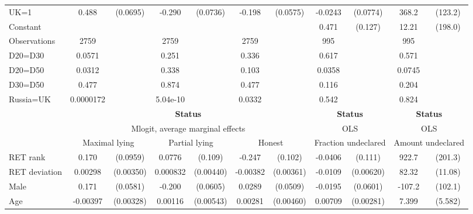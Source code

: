 \begin{tabular}{l|cccccc|cc|cc}
UK=1            &    0.488\sym{***}& (0.0695)&   -0.290\sym{***}& (0.0736)&   -0.198\sym{***}& (0.0575)&  -0.0243         & (0.0774)&    368.2\sym{***}&  (123.2)\\
Constant        &                  &         &                  &         &                  &         &    0.471\sym{***}&  (0.127)&    12.21         &  (198.0)\\
\hline
Observations    &     2759         &         &     2759         &         &     2759         &         &      995         &         &      995         &         \\
D20=D30         &   0.0571         &         &    0.251         &         &    0.336         &         &    0.617         &         &    0.571         &         \\
D20=D50         &   0.0312         &         &    0.338         &         &    0.103         &         &   0.0358         &         &   0.0745         &         \\
D30=D50         &    0.477         &         &    0.874         &         &    0.477         &         &    0.116         &         &    0.204         &         \\
Russia=UK       &0.0000172         &         & 5.04e-10         &         &   0.0332         &         &    0.542         &         &    0.824         &         \\
\hline\hline
&\multicolumn{6}{c|}{\bf Status}&\multicolumn{2}{c|}{\bf Status}&\multicolumn{2}{c}{\bf Status}\\ &\multicolumn{6}{c|}{Mlogit, average marginal effects }&\multicolumn{2}{c|}{OLS}&\multicolumn{2}{c}{OLS}\\
                &\multicolumn{2}{c}{Maximal lying}&\multicolumn{2}{c}{Partial lying}&\multicolumn{2}{c}{Honest}  &\multicolumn{2}{c}{Fraction undeclared}&\multicolumn{2}{c}{Amount undeclared}\\
\hline
RET rank        &    0.170\sym{*}  & (0.0959)&   0.0776         &  (0.109)&   -0.247\sym{**} &  (0.102)&  -0.0406         &  (0.111)&    922.7\sym{***}&  (201.3)\\
RET deviation   &  0.00298         &(0.00350)& 0.000832         &(0.00440)& -0.00382         &(0.00361)&  -0.0109\sym{*}  &(0.00620)&    82.32\sym{***}&  (11.08)\\
Male            &    0.171\sym{***}& (0.0581)&   -0.200\sym{***}& (0.0605)&   0.0289         & (0.0509)&  -0.0195         & (0.0601)&   -107.2         &  (102.1)\\
Age             & -0.00397         &(0.00328)&  0.00116         &(0.00543)&  0.00281         &(0.00460)&  0.00709\sym{**} &(0.00281)&    7.399         &  (5.582)\\

\end{tabular}
